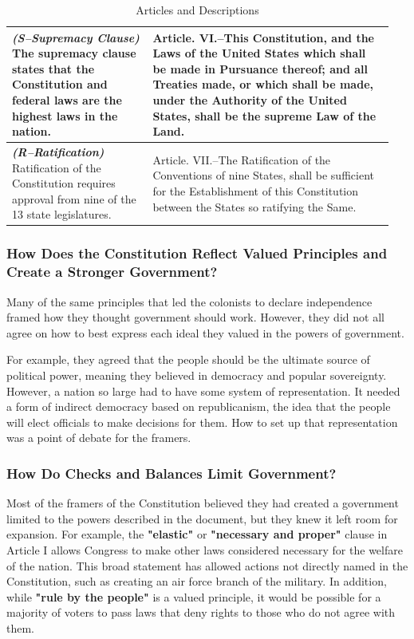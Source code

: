 \begin{center}
\begin{table}[htbp]
\begin{tabular}{ p{0.35\linewidth} | p{0.6\linewidth} }
			\textbf{\textit{(S–Supremacy Clause)}} The supremacy clause states that the Constitution and federal laws are the highest laws
			in the nation. & Article. VI.–This Constitution, and the Laws of the United States which shall be made in Pursuance thereof;
			and all Treaties made, or which shall be made, under the Authority of the United States, shall be the supreme Law of the Land.
			\\ \hline
			\textbf{\textit{(R–Ratification)}} Ratification of the Constitution requires approval from nine of the 13 state legislatures. &
			Article. VII.–The Ratification of the Conventions of nine States, shall be sufficient for the Establishment of this
			Constitution between the States so ratifying the Same. \\ \hline
		\end{tabular}

		\caption{Articles and Descriptions}
		\label{table:articles-and-descriptions}
	\end{table}
\end{center}

\newpage

\subsubsection*{How Does the Constitution Reflect Valued Principles and Create a Stronger Government?}

Many of the same principles that led the colonists to declare independence framed how they thought government should work. However, they
did not all agree on how to best express each ideal they valued in the powers of government.

For example, they agreed that the people should be the ultimate source of political power, meaning they believed in democracy and popular
sovereignty. However, a nation so large had to have some system of representation. It needed a form of indirect democracy based on
republicanism, the idea that the people will elect officials to make decisions for them. How to set up that representation was a point of
debate for the framers.

\subsubsection*{How Do Checks and Balances Limit Government?}

Most of the framers of the Constitution believed they had created a government limited to the powers described in the document, but they
knew it left room for expansion. For example, the \textbf{"elastic"} or \textbf{"necessary and proper"} clause in Article I allows Congress
to make other laws considered necessary for the welfare of the nation. This broad statement has allowed actions not directly named in the
Constitution, such as creating an air force branch of the military. In addition, while \textbf{"rule by the people"} is a valued principle,
it would be possible for a majority of voters to pass laws that deny rights to those who do not agree with them.

